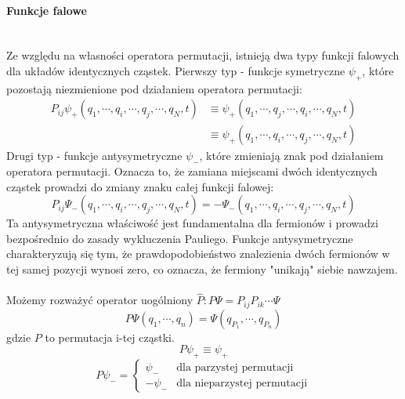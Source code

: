 \paragraph*{Funkcje falowe}\mbox{}\\
%
Ze względu na własności operatora permutacji, istnieją dwa typy funkcji falowych dla układów identycznych cząstek.
Pierwszy typ - funkcje symetryczne $\psi_+$, które pozostają niezmienione pod działaniem operatora permutacji:
%
\begin{equation*}
    \begin{aligned}
        P_{ij} \psi_+ (q_1, \cdots, q_i, \cdots, q_j, \cdots, q_N, t) &\equiv \psi_+ (q_1, \cdots, q_j, \cdots, q_i, \cdots, q_N, t) \\
        &\equiv \psi_+ (q_1, \cdots, q_i, \cdots, q_j, \cdots, q_N, t)
    \end{aligned}
\end{equation*}
%
Drugi typ - funkcje antysymetryczne $\psi_-$, które zmieniają znak pod działaniem operatora permutacji.
Oznacza to, że zamiana miejscami dwóch identycznych cząstek prowadzi do zmiany znaku całej funkcji falowej:
%
\begin{equation*}
    P_{ij} \Psi_- (q_1, \cdots, q_i, \cdots, q_j, \cdots, q_N, t) = - \Psi_- (q_1, \cdots, q_i, \cdots, q_j, \cdots, q_N, t)
\end{equation*}
Ta antysymetryczna właściwość jest fundamentalna dla fermionów i prowadzi bezpośrednio do zasady wykluczenia Pauliego.
Funkcje antysymetryczne charakteryzują się tym, że prawdopodobieństwo znalezienia dwóch fermionów w tej samej pozycji wynosi zero,
co oznacza, że fermiony "unikają" siebie nawzajem.
%
\\ \\
%
Możemy rozważyć operator uogólniony $\hat{P}: P \Psi = P_{ij}P_{ik} \cdots \Psi$
%
\begin{equation*}
    P \Psi  (q_1, \cdots, q_n) = \Psi(q_{P_1}, \cdots, q_{P_n})
\end{equation*}
%
gdzie $P$ to permutacja i-tej cząstki.
%
\begin{equation*}
    P \psi_+ \equiv \psi_+
\end{equation*}
%
\begin{equation*}
    P \psi_- =
    \begin{cases}
        \psi_- & \text{dla parzystej permutacji} \\
        - \psi_- & \text{dla nieparzystej permutacji}
    \end{cases}
\end{equation*}
%
